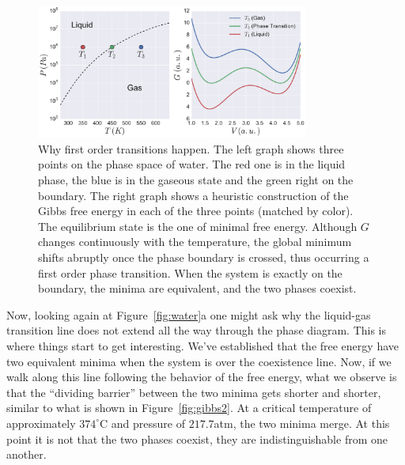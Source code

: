 \begin{figure}[t]
\begin{center}
    \includegraphics[width=0.8\textwidth]{chapters/ch2-crit/figs/gibbs1}
\end{center}
\caption{Why first order transitions happen. The left graph shows three points
    on the phase space of water. The red one is in the liquid phase, the blue
    is in the gaseous state and the green right on the boundary. The right
    graph shows a heuristic construction of the Gibbs free energy in each of
    the three points (matched by color). The equilibrium state is the one of
    minimal free energy. Although $G$ changes continuously with the
    temperature, the global minimum shifts abruptly once the phase boundary is
    crossed, thus occurring a first order phase transition. When the system is
    exactly on the boundary, the minima are equivalent, and the two phases
    coexist.}
\label{fig:gibbs1}
\end{figure}

Now, looking again at Figure~\ref{fig:water}a one might ask why the liquid-gas
transition line does not extend all the way through the phase diagram. This
is where things start to get interesting. We've established that the free
energy have two equivalent minima when the system is over the coexistence line.
Now, if we walk along this line following the behavior of the free energy, what
we observe is that the ``dividing barrier'' between  the two minima gets shorter
and shorter, similar to what is shown in Figure~\ref{fig:gibbs2}. At a critical
temperature of approximately $374^\circ$C and pressure of $217.7$atm, the two
minima merge. At this point it is not that the two phases coexist, they are
indistinguishable from one another.

